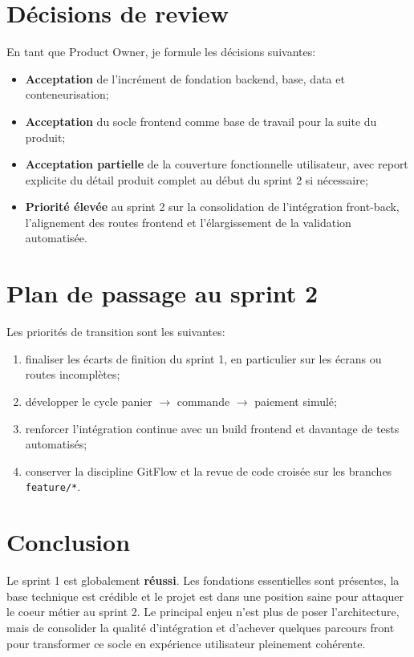 \documentclass[11pt,a4paper]{article}
\begin{document}
\section{Décisions de review}

En tant que Product Owner, je formule les décisions suivantes:

\begin{itemize}[leftmargin=1.5em]
  \item \textbf{Acceptation} de l'incrément de fondation backend, base, data et conteneurisation;
  \item \textbf{Acceptation} du socle frontend comme base de travail pour la suite du produit;
  \item \textbf{Acceptation partielle} de la couverture fonctionnelle utilisateur, avec report explicite du détail produit complet au début du sprint 2 si nécessaire;
  \item \textbf{Priorité élevée} au sprint 2 sur la consolidation de l'intégration front-back, l'alignement des routes frontend et l'élargissement de la validation automatisée.
\end{itemize}

\section{Plan de passage au sprint 2}

Les priorités de transition sont les suivantes:

\begin{enumerate}[leftmargin=1.5em]
  \item finaliser les écarts de finition du sprint 1, en particulier sur les écrans ou routes incomplètes;
  \item développer le cycle panier $\rightarrow$ commande $\rightarrow$ paiement simulé;
  \item renforcer l'intégration continue avec un build frontend et davantage de tests automatisés;
  \item conserver la discipline GitFlow et la revue de code croisée sur les branches \texttt{feature/*}.
\end{enumerate}

\section{Conclusion}

Le sprint 1 est globalement \textbf{réussi}. Les fondations essentielles sont présentes, la base technique est crédible et le projet est dans une position saine pour attaquer le coeur métier au sprint 2. Le principal enjeu n'est plus de poser l'architecture, mais de consolider la qualité d'intégration et d'achever quelques parcours front pour transformer ce socle en expérience utilisateur pleinement cohérente.
\end{document}
